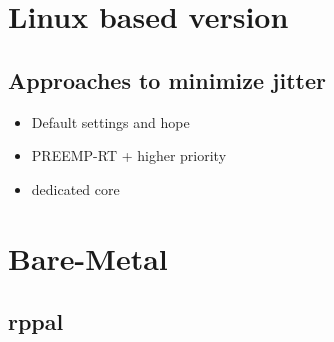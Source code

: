 \section{Linux based version}
\label{sec:concept_and_implementation:linux}

\subsection{Approaches to minimize jitter}
\label{sec:concept_and_implementation:linux:approaches}

\begin{itemize}
    \item Default settings and hope
    \item PREEMP-RT + higher priority
    \item dedicated core
\end{itemize}

\section{Bare-Metal}
\label{sec:concept_and_implementation:bare_metal}

\subsection{rppal}

